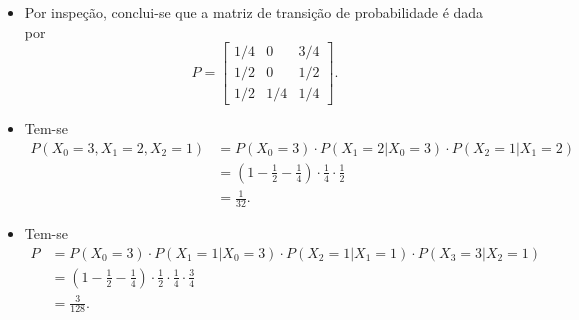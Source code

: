 \begin{respostas}
\begin{itemize}
    \item [a)] Por inspeção, conclui-se que a matriz de transição de probabilidade é dada por
    \begin{equation}
        P = \begin{bmatrix}
            1/4 & 0   & 3/4 \\
            1/2 & 0   & 1/2 \\
            1/2 & 1/4 & 1/4
        \end{bmatrix}.
    \end{equation}

    \item [b)] Tem-se
    \begin{align}
        P(X_0=3, X_1=2, X_2=1) &= P(X_0=3) \cdot P(X_1=2 | X_0=3) \cdot P(X_2=1 | X_1=2 ) \\
        &= \left(1 - \frac{1}{2} - \frac{1}{4}\right) \cdot \frac{1}{4} \cdot \frac{1}{2} \\
        &= \frac{1}{32}.
    \end{align}
    
    \item [c)] Tem-se
    \begin{align}
        P &= P(X_0=3) \cdot P(X_1=1 | X_0=3) \cdot P(X_2=1 | X_1=1) \cdot P(X_3=3 | X_2=1) \\
        &= \left(1 - \frac{1}{2} - \frac{1}{4}\right) \cdot \frac{1}{2} \cdot \frac{1}{4} \cdot \frac{3}{4} \\
        &= \frac{3}{128}.
    \end{align}
\end{itemize}
\end{respostas}